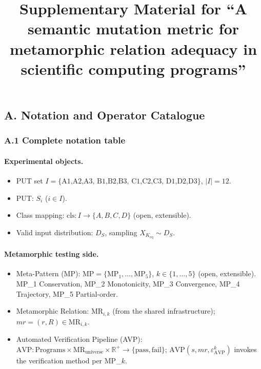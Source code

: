 \documentclass[review,12pt,authoryear]{elsarticle}
\begin{document}
\begin{frontmatter}
\title{Supplementary Material for ``A semantic mutation metric for
metamorphic relation adequacy in scientific computing programs''}
\end{frontmatter}

\appendix

\subsection{A. Notation and Operator Catalogue}\label{a.-notation-and-operator-catalogue}

\subsubsection{A.1 Complete notation table}\label{a.1-complete-notation-table}

\paragraph{Experimental objects.}
\begin{itemize}
\item PUT set $I = \{\text{A1,A2,A3, B1,B2,B3, C1,C2,C3, D1,D2,D3}\}$, $|I| = 12$.
\item PUT: $S_i$ ($i \in I$).
\item Class mapping: $\mathrm{cls} : I \to \{A, B, C, D\}$ (open, extensible).
\item Valid input distribution: $D_S$, sampling $X_{K_{\mathrm{eq}}} \sim D_S$.
\end{itemize}

\paragraph{Metamorphic testing side.}
\begin{itemize}
\item Meta-Pattern (MP): $\mathrm{MP} = \{\mathrm{MP}_1, \ldots, \mathrm{MP}_5\}$, $k \in \{1,\ldots,5\}$ (open, extensible). MP\_1 Conservation, MP\_2 Monotonicity, MP\_3 Convergence, MP\_4 Trajectory, MP\_5 Partial-order.
\item Metamorphic Relation: $\mathrm{MR}_{i,k}$ (from the shared infrastructure); $\mathit{mr} = (r, R) \in \mathrm{MR}_{i,k}$.
\item Automated Verification Pipeline (AVP): $\mathrm{AVP} : \text{Programs} \times \mathrm{MR}_{\text{universe}} \times \mathbb{R}^+ \to \{\text{pass}, \text{fail}\}$; $\mathrm{AVP}(s, \mathit{mr}, \varepsilon_{\mathrm{AVP}}^k)$ invokes the verification method per MP\_$k$.
\end{itemize}
\end{document}
